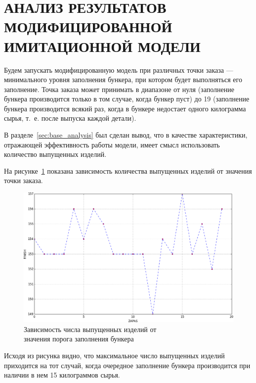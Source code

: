 \section[Анализ результатов модифицированной имитационной модели]{
  АНАЛИЗ РЕЗУЛЬТАТОВ МОДИФИЦИРОВАННОЙ \\
  ИМИТАЦИОННОЙ МОДЕЛИ}

Будем запускать модифицированную модель при различных точки заказа ---
минимального уровня заполнения бункера, при котором будет выполняться его
заполнение. Точка заказа может принимать в диапазоне от нуля (заполнение
бункера производится только в том случае, когда бункер пуст) до 19
(заполнение бункера производится всякий раз, 
когда в бункере недостает одного килограмма сырья,
т.~е. после выпуска каждой детали).

В разделе~\ref{sec:base_analysis} был сделан вывод, что в качестве 
характеристики, отражающей эффективность работы модели, имеет смысл использовать
количество выпущенных изделий.

На рисунке~\ref{pic:modification_chart} показана зависимость количества 
выпущенных изделий от значения точки заказа.

\begin{figure}[h!]
  \centering
  \includegraphics[width=150mm]{pic/modification_chart}
  \caption{Зависимость числа выпущенных изделий от \\
    значения порога заполнения бункера}
  \label{pic:modification_chart}
\end{figure}

Исходя из рисунка видно, что максимальное число выпущенных изделий 
приходится на тот случай, когда очередное заполнение бункера
производится при наличии в нем 15 килограммов сырья. 

